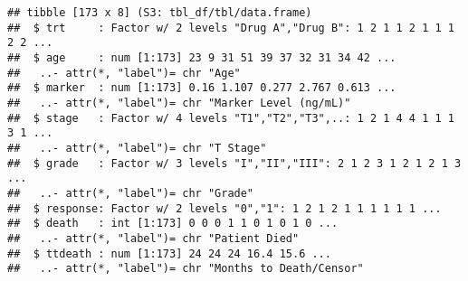 \documentclass[
]{article}
\newenvironment{Shaded}{\begin{snugshade}}{\end{snugshade}}
\newcommand{\CommentTok}[1]{\textcolor[rgb]{0.56,0.35,0.01}{\textit{#1}}}
\newcommand{\FunctionTok}[1]{\textcolor[rgb]{0.13,0.29,0.53}{\textbf{#1}}}
\newcommand{\NormalTok}[1]{#1}
\newcommand{\OtherTok}[1]{\textcolor[rgb]{0.56,0.35,0.01}{#1}}
\newcommand{\SpecialCharTok}[1]{\textcolor[rgb]{0.81,0.36,0.00}{\textbf{#1}}}
\newcommand{\StringTok}[1]{\textcolor[rgb]{0.31,0.60,0.02}{#1}}
\begin{document}
\begin{Shaded}
\end{Shaded}

\begin{verbatim}
## tibble [173 x 8] (S3: tbl_df/tbl/data.frame)
##  $ trt     : Factor w/ 2 levels "Drug A","Drug B": 1 2 1 1 2 1 1 1 2 2 ...
##  $ age     : num [1:173] 23 9 31 51 39 37 32 31 34 42 ...
##   ..- attr(*, "label")= chr "Age"
##  $ marker  : num [1:173] 0.16 1.107 0.277 2.767 0.613 ...
##   ..- attr(*, "label")= chr "Marker Level (ng/mL)"
##  $ stage   : Factor w/ 4 levels "T1","T2","T3",..: 1 2 1 4 4 1 1 1 3 1 ...
##   ..- attr(*, "label")= chr "T Stage"
##  $ grade   : Factor w/ 3 levels "I","II","III": 2 1 2 3 1 2 1 2 1 3 ...
##   ..- attr(*, "label")= chr "Grade"
##  $ response: Factor w/ 2 levels "0","1": 1 2 1 2 1 1 1 1 1 1 ...
##  $ death   : int [1:173] 0 0 0 1 1 0 1 0 1 0 ...
##   ..- attr(*, "label")= chr "Patient Died"
##  $ ttdeath : num [1:173] 24 24 24 16.4 15.6 ...
##   ..- attr(*, "label")= chr "Months to Death/Censor"
\end{verbatim}
\end{document}
